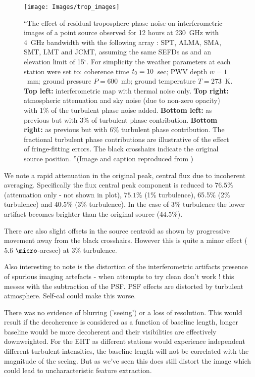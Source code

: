 \begin{figure}[h!]
\texttt{[image: Images/trop\_images]}
\caption{``The effect of residual troposphere phase noise on interferometric images of a point source observed for 12 hours at 230~GHz with 4~GHz bandwidth with the following array : SPT, ALMA, SMA, SMT, LMT and JCMT, assuming the same SEFDs as \protect\citet{Lu_2014} and an elevation limit of 15$^\circ$. For simplicity the weather parameters at each station were set to: coherence time $t_{\rm 0}=10$~sec; PWV depth $w=1$~mm; ground pressure $P=600$~mb; ground temperature $T =273$~K. {\bf Top left:} interferometric map with thermal noise only. {\bf Top right:} atmospheric attenuation and sky noise (due to non-zero opacity) with 1\% of the turbulent phase noise added. {\bf Bottom left:} as previous but with 3\% of turbulent phase contribution. {\bf Bottom right:} as previous but with 6\% turbulent phase contribution. The fractional turbulent phase contributions are illustrative of the effect of fringe-fitting errors. The black crosshairs indicate the original source position. ''(Image and caption reproduced from \citet{Blecher_2016}) \label{fig:trop_images}%
}
\end{figure}


We note a rapid attenuation in the original peak, central flux due to incoherent averaging. Specifically the flux central peak component is reduced to $76.5\%$ (attenuation only - not shown in plot), $75.1\%$ (1\% turbulence), 65.5\% (2\% turbulence) and  40.5\% (3\% turbulence). In the case of 3\% turbulence the lower artifact becomes brighter than the original source (44.5\%). 


There are also slight offsets in the source centroid as shown by progressive movement away from the black crosshairs. However this is quite a minor effect ($5.6\ \micro$-arcsec) at 3\% turbulence. 

Also interesting to note is the distortion of the interferometric artifacts presence of spurious imaging artefacts - when attempts to try clean don't work ! this messes with the subtraction of the PSF. PSF effects are distorted by turbulent atmosphere. Self-cal could make this worse.


There was no evidence of blurring ('seeing') or a loss of resolution. This would result if the decoherence is considered as a function of baseline length, longer baseline would be more decoherent and their visibilities are effectively downweighted. For the EHT as different stations would experience independent different turbulent intensities, the baseline length will not be correlated with the magnitude of the seeing. But as we've seen this does still distort the image which could lead to uncharacteristic feature extraction.

